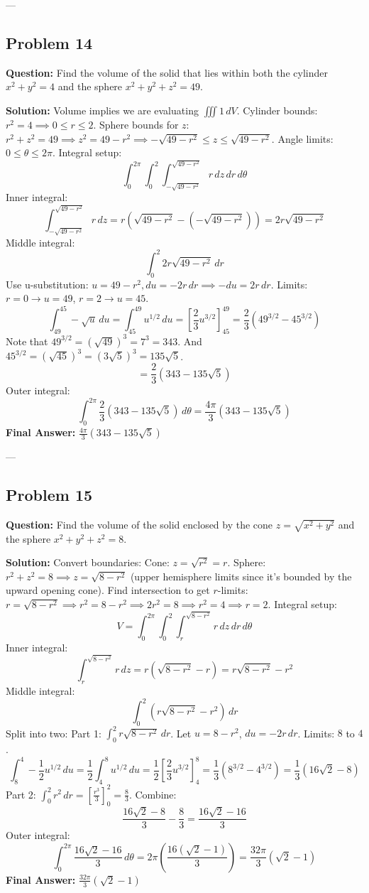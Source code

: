 \documentclass[11pt]{article}
\begin{document}
---

\subsection*{Problem 14}
\textbf{Question:} Find the volume of the solid that lies within both the cylinder $x^2 + y^2 = 4$ and the sphere $x^2 + y^2 + z^2 = 49$.

\textbf{Solution:}
Volume implies we are evaluating $\iiint 1 \, dV$.
Cylinder bounds: $r^2 = 4 \implies 0 \leq r \leq 2$.
Sphere bounds for $z$: $r^2 + z^2 = 49 \implies z^2 = 49 - r^2 \implies -\sqrt{49 - r^2} \leq z \leq \sqrt{49 - r^2}$.
Angle limits: $0 \leq \theta \leq 2\pi$.
Integral setup:
\[ \int_0^{2\pi} \int_0^2 \int_{-\sqrt{49-r^2}}^{\sqrt{49-r^2}} r \, dz \, dr \, d\theta \]
Inner integral:
\[ \int_{-\sqrt{49-r^2}}^{\sqrt{49-r^2}} r \, dz = r \left( \sqrt{49-r^2} - (-\sqrt{49-r^2}) \right) = 2r\sqrt{49-r^2} \]
Middle integral:
\[ \int_0^2 2r\sqrt{49-r^2} \, dr \]
Use u-substitution: $u = 49 - r^2, du = -2r \, dr \implies -du = 2r \, dr$.
Limits: $r=0 \to u=49$, $r=2 \to u=45$.
\[ \int_{49}^{45} -\sqrt{u} \, du = \int_{45}^{49} u^{1/2} \, du = \left[ \frac{2}{3}u^{3/2} \right]_{45}^{49} = \frac{2}{3}(49^{3/2} - 45^{3/2}) \]
Note that $49^{3/2} = (\sqrt{49})^3 = 7^3 = 343$. And $45^{3/2} = (\sqrt{45})^3 = (3\sqrt{5})^3 = 135\sqrt{5}$.
\[ = \frac{2}{3}(343 - 135\sqrt{5}) \]
Outer integral:
\[ \int_0^{2\pi} \frac{2}{3}(343 - 135\sqrt{5}) \, d\theta = \frac{4\pi}{3}(343 - 135\sqrt{5}) \]
\textbf{Final Answer:} $\frac{4\pi}{3}(343 - 135\sqrt{5})$

---

\subsection*{Problem 15}
\textbf{Question:} Find the volume of the solid enclosed by the cone $z = \sqrt{x^2 + y^2}$ and the sphere $x^2 + y^2 + z^2 = 8$.

\textbf{Solution:}
Convert boundaries:
Cone: $z = \sqrt{r^2} = r$.
Sphere: $r^2 + z^2 = 8 \implies z = \sqrt{8 - r^2}$ (upper hemisphere limits since it's bounded by the upward opening cone).
Find intersection to get $r$-limits: $r = \sqrt{8 - r^2} \implies r^2 = 8 - r^2 \implies 2r^2 = 8 \implies r^2 = 4 \implies r = 2$.
Integral setup:
\[ V = \int_0^{2\pi} \int_0^2 \int_r^{\sqrt{8-r^2}} r \, dz \, dr \, d\theta \]
Inner integral:
\[ \int_r^{\sqrt{8-r^2}} r \, dz = r(\sqrt{8-r^2} - r) = r\sqrt{8-r^2} - r^2 \]
Middle integral:
\[ \int_0^2 (r\sqrt{8-r^2} - r^2) \, dr \]
Split into two:
Part 1: $\int_0^2 r\sqrt{8-r^2} \, dr$. Let $u = 8-r^2$, $du = -2r \, dr$. Limits: $8$ to $4$.
\[ \int_8^4 -\frac{1}{2}u^{1/2} \, du = \frac{1}{2} \int_4^8 u^{1/2} \, du = \frac{1}{2} \left[ \frac{2}{3}u^{3/2} \right]_4^8 = \frac{1}{3}(8^{3/2} - 4^{3/2}) = \frac{1}{3}(16\sqrt{2} - 8) \]
Part 2: $\int_0^2 r^2 \, dr = \left[ \frac{r^3}{3} \right]_0^2 = \frac{8}{3}$.
Combine:
\[ \frac{16\sqrt{2} - 8}{3} - \frac{8}{3} = \frac{16\sqrt{2} - 16}{3} \]
Outer integral:
\[ \int_0^{2\pi} \frac{16\sqrt{2} - 16}{3} \, d\theta = 2\pi \left( \frac{16(\sqrt{2} - 1)}{3} \right) = \frac{32\pi}{3}(\sqrt{2} - 1) \]
\textbf{Final Answer:} $\frac{32\pi}{3}(\sqrt{2} - 1)$
\end{document}
